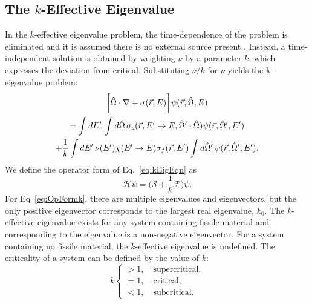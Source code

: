 \subsection{The $k$-Effective Eigenvalue}
\label{subsec:k}

In the $k$-effective eigenvalue problem, the time-dependence of the problem is eliminated and it is assumed there is no external source present \cite{bell_nuclear_1970}. Instead, a time-independent solution is obtained by weighting $\nu$ by a parameter $k$, which expresses the deviation from critical. Substituting $\nu/k$ for $\nu$ yields the k-eigenvalue problem: 
\begin{multline}
	\bigg [ \hat{\Omega} \cdot \nabla + \sigma(\vec{r},E) \bigg ] \psi(\vec{r},\hat{\Omega},E) \\ = \int \mathop{}\!d E' \, \int \mathop{}\!d \hat{\Omega} \, \sigma_{s}(\vec{r},E'\rightarrow E,\hat{\Omega}' \cdot \hat{\Omega}) \psi(\vec{r},\hat{\Omega}',E') \\ + \frac{1}{k} \int \mathop{}\!d E' \, \nu(E') \chi(E'\rightarrow E) \sigma_{f}(\vec{r},E') \int \mathop{}\!d \hat{\Omega}' \, \psi(\vec{r},\hat{\Omega}',E').
	\label{eq:kEigEqn}
\end{multline}
We define the operator form of Eq.~\ref{eq:kEigEqn} as
\begin{equation}
\mathcal{H} \psi = \bigg ( \mathcal{S} + \frac{1}{k}\mathcal{F} \bigg ) \psi.
\label{eq:OpFormk}
\end{equation}
For Eq~\ref{eq:OpFormk}, there are multiple eigenvalues and eigenvectors, but the only positive eigenvector corresponds to the largest real eigenvalue, $k_{0}$. The $k$-effective eigenvalue exists for any system containing fissile material and corresponding to the eigenvalue is a non-negative eigenvector. For a system containing no fissile material, the $k$-effective eigenvalue is undefined. The criticality of a system can be defined by the value of $k$:
	$$ k \begin{cases}						  			  			 > 1, \quad \text{supercritical,} \\			 			 			= 1, \quad \text{critical,} \\
					 < 1, \quad \text{subcritical.} 				       \end{cases} $$

